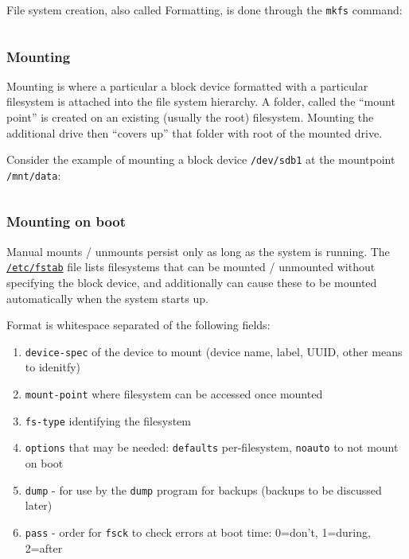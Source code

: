 File system creation, also called Formatting, is done through the
\texttt{mkfs} command:

\inputminted{bash}{fs_creation.sh}

\subsubsection{Mounting}\label{mounting}

Mounting is where a particular a block device formatted with a
particular filesystem is attached into the file system hierarchy. A
folder, called the ``mount point'' is created on an existing (usually
the root) filesystem. Mounting the additional drive then ``covers up''
that folder with root of the mounted drive.

Consider the example of mounting a block device \texttt{/dev/sdb1} at
the mountpoint \texttt{/mnt/data}:

\inputminted{bash}{fs_mounting.sh}

\subsubsection{Mounting on boot}\label{mounting-on-boot}

Manual mounts / unmounts persist only as long as the system is running.
The \href{https://en.wikipedia.org/wiki/Fstab}{\texttt{/etc/fstab}} file
lists filesystems that can be mounted / unmounted without specifying the
block device, and additionally can cause these to be mounted
automatically when the system starts up.

Format is whitespace separated of the following fields:

\begin{enumerate}
\def\labelenumi{\arabic{enumi}.}
\item
  \texttt{device-spec} of the device to mount (device name, label, UUID,
  other means to idenitfy)
\item
  \texttt{mount-point} where filesystem can be accessed once mounted
\item
  \texttt{fs-type} identifying the filesystem
\item
  \texttt{options} that may be needed: \texttt{defaults} per-filesystem,
  \texttt{noauto} to not mount on boot
\item
  \texttt{dump} - for use by the \texttt{dump} program for backups
  (backups to be discussed later)
\item
  \texttt{pass} - order for \texttt{fsck} to check errors at boot time:
  0=don't, 1=during, 2=after
\end{enumerate}

